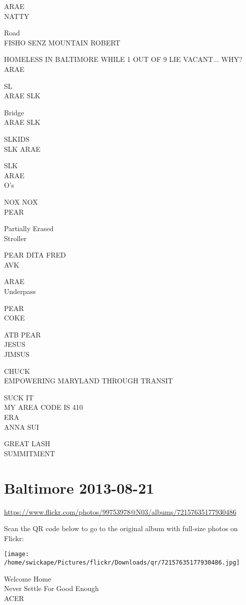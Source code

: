 \documentclass[10pt,letterpaper]{article}
\begin{document}
ARAE\\
NATTY

Road\\
FISHO SENZ MOUNTAIN ROBERT

HOMELESS IN BALTIMORE WHILE 1 OUT OF 9 LIE VACANT... WHY?\\
ARAE

SL\\
ARAE SLK

Bridge\\
ARAE SLK

SLKIDS\\
SLK ARAE

SLK\\
ARAE\\
O's

NOX NOX\\
PEAR

Partially Erased\\
Stroller

PEAR DITA FRED\\
AVK

ARAE\\
Underpass

PEAR\\
COKE

ATB PEAR\\
JESUS\\
JIMSUS

CHUCK\\
EMPOWERING MARYLAND THROUGH TRANSIT

SUCK IT\\
MY AREA CODE IS 410\\
ERA\\
ANNA SUI

GREAT LASH\\
SUMMITMENT


\section*{Baltimore 2013-08-21}

\url{https://www.flickr.com/photos/99753978@N03/albums/72157635177930486}

Scan the QR code below to go to the original album with full-size photos on Flickr:

\texttt{[image: /home/swickape/Pictures/flickr/Downloads/qr/72157635177930486.jpg]}


Welcome Home\\
Never Settle For Good Enough\\
ACER
\end{document}
